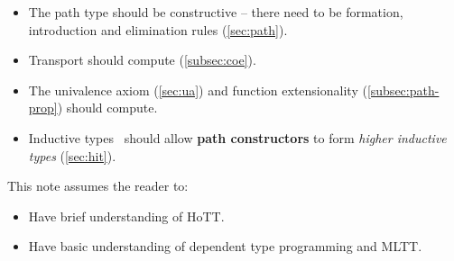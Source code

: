 \begin{itemize}
\item The path type should be constructive --
  there need to be formation, introduction and
  elimination rules (\cref{sec:path}).
\item Transport should compute (\cref{subsec:coe}).
\item The univalence axiom (\cref{sec:ua}) and function extensionality
  (\cref{subsec:path-prop}) should compute.
\item Inductive types~\cite{Inductive} should allow \textbf{path constructors}
  to form \textit{higher inductive types} (\cref{sec:hit}).
\end{itemize}

This note assumes the reader to:

\begin{itemize}
\item Have brief understanding of HoTT.
\item Have basic understanding of dependent type programming and MLTT.
\end{itemize}